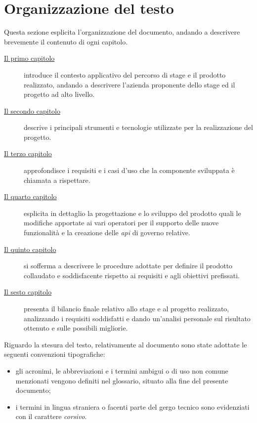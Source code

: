 \section{Organizzazione del testo}
Questa sezione esplicita l'organizzazione del documento, andando a descrivere brevemente il contenuto di ogni capitolo.

\begin{description}
	\item[{\hyperref[cap:introduzione]{Il primo capitolo}}] introduce il contesto applicativo del percorso di stage e il prodotto realizzato, andando a descrivere l'azienda proponente dello stage ed il progetto ad alto livello.
 
    \item[{\hyperref[cap:strumenti-tecnologie]{Il secondo capitolo}}] descrive i principali strumenti e tecnologie utilizzate per la realizzazione del progetto.
    
    \item[{\hyperref[cap:analisi-requisiti]{Il terzo capitolo}}] approfondisce i requisiti e i casi d'uso che la componente sviluppata è chiamata a rispettare.
    
    \item[{\hyperref[cap:progettazione-codifica]{Il quarto capitolo}}] esplicita in dettaglio la progettazione e lo sviluppo del prodotto quali le modifiche apportate ai vari operatori per il supporto delle nuove funzionalità e la creazione delle \textit{\gls{api}} di governo relative.
    
    \item[{\hyperref[cap:verifica-validazione]{Il quinto capitolo}}] si sofferma a descrivere le procedure adottate per definire il prodotto collaudato e soddisfacente rispetto ai requisiti e agli obiettivi prefissati.
    
    \item[{\hyperref[cap:conclusioni]{Il sesto capitolo}}] presenta il bilancio finale relativo allo stage e al progetto realizzato, analizzando i requisiti soddisfatti e dando un'analisi personale sul risultato ottenuto e sulle possibili migliorie.
\end{description}

Riguardo la stesura del testo, relativamente al documento sono state adottate le seguenti convenzioni tipografiche:
\begin{itemize}
	\item gli acronimi, le abbreviazioni e i termini ambigui o di uso non comune menzionati vengono definiti nel glossario, situato alla fine del presente documento;
	\item i termini in lingua straniera o facenti parte del gergo tecnico sono evidenziati con il carattere \emph{corsivo}.
\end{itemize}